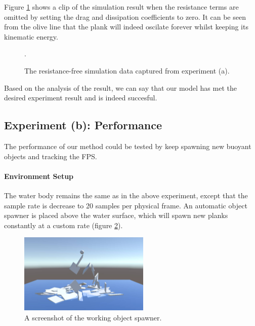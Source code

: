 Figure \ref{experiment-no-resistance} shows a clip of the simulation result when the resistance terms are omitted by setting the drag and  dissipation coefficients to zero.
It can be seen from the olive line that the plank will indeed oscilate forever whilst keeping its kinematic energy.

\begin{figure}[h]
	\centering
	\caption{The resistance-free simulation data captured from experiment (a).}.
	\label{experiment-no-resistance}
\end{figure}

Based on the analysis of the result, we can say that our model has met the desired experiment result and is indeed succesful.

\subsection{Experiment (b): Performance}

The performance of our method could be tested by keep spawning new buoyant objects and tracking the FPS.

\paragraph*{Environment Setup}

The water body remains the same as in the above experiment, except that the sample rate is decrease to 20 samples per physical frame.
An automatic object spawner is placed above the water surface, which will spawn new planks constantly at a custom rate (figure \ref{spawner-setup}).

\begin{figure}[h]
	\centering
	\includegraphics[height=1.5in]{figures/spawner-setup.jpg}
	\caption{A screenshot of the working object spawner.}
	\label{spawner-setup}
\end{figure}

